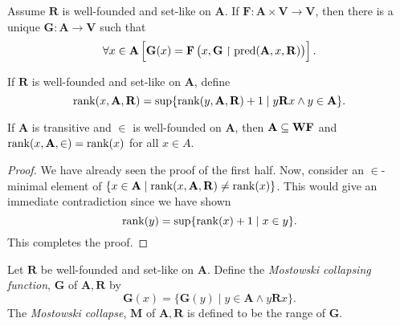 \begin{theorem}
    Assume $\mathbf R$ is well-founded and set-like on $\mathbf A$. If $\mathbf F: \mathbf A\times\mathbf V\to\mathbf V$, then there is a unique $\mathbf G:\mathbf A\to\mathbf V$ such that 
    \begin{equation*}
        \forall x\in\mathbf A\left[\mathbf G(x) = \mathbf F\left(x, \mathbf G\upharpoonright\operatorname{pred}(\mathbf A, x,\mathbf R)\right)\right].
    \end{equation*}
\end{theorem}

\begin{definition}
    If $\mathbf R$ is well-founded and set-like on $\mathbf A$, define 
    \begin{equation*}
        \operatorname{rank}(x,\mathbf A,\mathbf R) = \sup\{\operatorname{rank}(y,\mathbf A,\mathbf R) + 1\mid y\mathbf R x\wedge y\in\mathbf A\}.
    \end{equation*}
\end{definition}

\begin{lemma}
    If $\mathbf A$ is transitive and $\in$ is well-founded on $\mathbf A$, then $\mathbf A\subseteq\mathbf{WF}$ and $\operatorname{rank}(x,\mathbf A, \in) = \operatorname{rank}(x)$ for all $x\in A$.
\end{lemma}
\begin{proof}
    We have already seen the proof of the first half. Now, consider an $\in$-minimal element of $\{x\in\mathbf A\mid\operatorname{rank}(x,\mathbf A,\mathbf R)\ne\operatorname{rank}(x)\}$. This would give an immediate contradiction since we have shown 
    \begin{equation*}
        \operatorname{rank}(y) = \sup\{\operatorname{rank}(x) + 1\mid x\in y\}.
    \end{equation*}
    This completes the proof.
\end{proof}

\begin{definition}
    Let $\mathbf R$ be well-founded and set-like on $\mathbf A$. Define the \emph{Mostowski collapsing function}, $\mathbf G$ of $\mathbf A, \mathbf R$ by 
    \begin{equation*}
        \mathbf G(x) = \{\mathbf G(y)\mid y\in\mathbf A\wedge y\mathbf R x\}.
    \end{equation*}
    The \emph{Mostowski collapse}, $\mathbf M$ of $\mathbf A,\mathbf R$ is defined to be the range of $\mathbf G$.
\end{definition}

